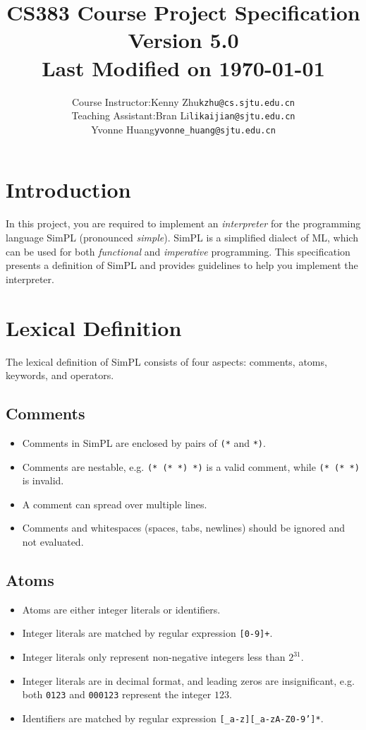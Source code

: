 \documentclass{article}
\title{
  \textbf{CS383 Course Project Specification} \\
  \textbf{\normalsize Version 5.0} \\
  {\normalsize Last Modified on \today}}
\author{
  \normalsize
  \begin{tabular}{rcl}
    Course Instructor: & Kenny Zhu & \texttt{kzhu@cs.sjtu.edu.cn} \\
    Teaching Assistant: & Bran Li& \texttt{likaijian@sjtu.edu.cn} \\
    					& Yvonne Huang& \texttt{yvonne\_huang@sjtu.edu.cn}
  \end{tabular}}
\date{}
\begin{document}
\maketitle

\section{Introduction}

In this project, you are required to implement an \emph{interpreter} for the
programming language SimPL (pronounced \emph{simple}).  SimPL is a simplified
dialect of ML, which can be used for both \emph{functional} and
\emph{imperative} programming.  This specification presents a definition of
SimPL and provides guidelines to help you implement the interpreter.

\section{Lexical Definition}

The lexical definition of SimPL consists of four aspects: comments, atoms, keywords, and operators.

\subsection{Comments}

\begin{itemize}
  \item Comments in SimPL are enclosed by pairs of \texttt{(*} and \texttt{*)}.
  \item Comments are nestable, e.g. \texttt{(*  (*  *)  *)} is a valid comment, while \texttt{(*  (*  *)} is invalid.
  \item A comment can spread over multiple lines.
  \item Comments and whitespaces (spaces, tabs, newlines) should be ignored and not evaluated.
\end{itemize}

\subsection{Atoms}

\begin{itemize}
  \item Atoms are either integer literals or identifiers.
  \item Integer literals are matched by regular expression \texttt{[0-9]+}.
  \item Integer literals only represent non-negative integers less than $2^{31}$.
  \item Integer literals are in decimal format, and leading zeros are insignificant, e.g. both \texttt{0123} and \texttt{000123} represent the integer $123$.
  \item Identifiers are matched by regular expression \texttt{[\_a-z][\_a-zA-Z0-9']*}.
\end{itemize}
\end{document}

